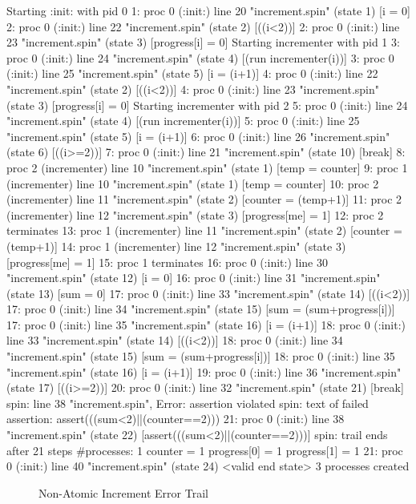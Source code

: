 { \scriptsize
\begin{verbbox}
Starting :init: with pid 0
 1: proc 0 (:init:) line 20 "increment.spin" (state 1) [i = 0]
 2: proc 0 (:init:) line 22 "increment.spin" (state 2) [((i<2))]
 2: proc 0 (:init:) line 23 "increment.spin" (state 3) [progress[i] = 0]
Starting incrementer with pid 1
 3: proc 0 (:init:) line 24 "increment.spin" (state 4) [(run incrementer(i))]
 3: proc 0 (:init:) line 25 "increment.spin" (state 5) [i = (i+1)]
 4: proc 0 (:init:) line 22 "increment.spin" (state 2) [((i<2))]
 4: proc 0 (:init:) line 23 "increment.spin" (state 3) [progress[i] = 0]
Starting incrementer with pid 2
 5: proc 0 (:init:) line 24 "increment.spin" (state 4) [(run incrementer(i))]
 5: proc 0 (:init:) line 25 "increment.spin" (state 5) [i = (i+1)]
 6: proc 0 (:init:) line 26 "increment.spin" (state 6) [((i>=2))]
 7: proc 0 (:init:) line 21 "increment.spin" (state 10) [break]
 8: proc 2 (incrementer) line 10 "increment.spin" (state 1) [temp = counter]
 9: proc 1 (incrementer) line 10 "increment.spin" (state 1) [temp = counter]
10: proc 2 (incrementer) line 11 "increment.spin" (state 2) [counter = (temp+1)]
11: proc 2 (incrementer) line 12 "increment.spin" (state 3) [progress[me] = 1]
12: proc 2 terminates
13: proc 1 (incrementer) line 11 "increment.spin" (state 2) [counter = (temp+1)]
14: proc 1 (incrementer) line 12 "increment.spin" (state 3) [progress[me] = 1]
15: proc 1 terminates
16: proc 0 (:init:) line 30 "increment.spin" (state 12)	[i = 0]
16: proc 0 (:init:) line 31 "increment.spin" (state 13)	[sum = 0]
17: proc 0 (:init:) line 33 "increment.spin" (state 14)	[((i<2))]
17: proc 0 (:init:) line 34 "increment.spin" (state 15)	[sum = (sum+progress[i])]
17: proc 0 (:init:) line 35 "increment.spin" (state 16)	[i = (i+1)]
18: proc 0 (:init:) line 33 "increment.spin" (state 14)	[((i<2))]
18: proc 0 (:init:) line 34 "increment.spin" (state 15)	[sum = (sum+progress[i])]
18: proc 0 (:init:) line 35 "increment.spin" (state 16)	[i = (i+1)]
19: proc 0 (:init:) line 36 "increment.spin" (state 17)	[((i>=2))]
20: proc 0 (:init:) line 32 "increment.spin" (state 21)	[break]
spin: line  38 "increment.spin", Error: assertion violated
spin: text of failed assertion: assert(((sum<2)||(counter==2)))
 21:	proc  0 (:init:) line  38 "increment.spin" (state 22)	[assert(((sum<2)||(counter==2)))]
spin: trail ends after 21 steps
#processes: 1
                counter = 1
                progress[0] = 1
                progress[1] = 1
21: proc 0 (:init:) line 40 "increment.spin" (state 24) <valid end state>
3 processes created
\end{verbbox}
}
\begin{figure}[htbp]
\centering
\theverbbox
\caption{Non-Atomic Increment Error Trail}
\label{fig:analysis:Non-Atomic Increment Error Trail}
\end{figure}

